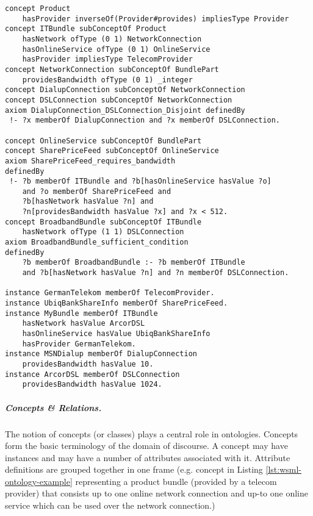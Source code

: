 \begin{lstlisting}[label=lst:wsml-ontology-example,style=wsml, caption=WSML Example Ontology]
concept Product
    hasProvider inverseOf(Provider#provides) impliesType Provider
concept ITBundle subConceptOf Product
    hasNetwork ofType (0 1) NetworkConnection
    hasOnlineService ofType (0 1) OnlineService
    hasProvider impliesType TelecomProvider
concept NetworkConnection subConceptOf BundlePart
    providesBandwidth ofType (0 1) _integer
concept DialupConnection subConceptOf NetworkConnection
concept DSLConnection subConceptOf NetworkConnection
axiom DialupConnection_DSLConnection_Disjoint definedBy
 !- ?x memberOf DialupConnection and ?x memberOf DSLConnection.

concept OnlineService subConceptOf BundlePart
concept SharePriceFeed subConceptOf OnlineService
axiom SharePriceFeed_requires_bandwidth
definedBy
 !- ?b memberOf ITBundle and ?b[hasOnlineService hasValue ?o]
    and ?o memberOf SharePriceFeed and
    ?b[hasNetwork hasValue ?n] and
    ?n[providesBandwidth hasValue ?x] and ?x < 512.
concept BroadbandBundle subConceptOf ITBundle
    hasNetwork ofType (1 1) DSLConnection
axiom BroadbandBundle_sufficient_condition
definedBy
    ?b memberOf BroadbandBundle :- ?b memberOf ITBundle
    and ?b[hasNetwork hasValue ?n] and ?n memberOf DSLConnection.

instance GermanTelekom memberOf TelecomProvider.
instance UbiqBankShareInfo memberOf SharePriceFeed.
instance MyBundle memberOf ITBundle
    hasNetwork hasValue ArcorDSL
    hasOnlineService hasValue UbiqBankShareInfo
    hasProvider GermanTelekom.
instance MSNDialup memberOf DialupConnection
    providesBandwidth hasValue 10.
instance ArcorDSL memberOf DSLConnection
    providesBandwidth hasValue 1024.

\end{lstlisting}

\subparagraph{\small \it \bfseries Concepts \& Relations.} The notion of concepts
(or classes) plays a central role in ontologies. Concepts form the
basic terminology of the domain of discourse. A concept may have
instances and may have a number of attributes associated with it.
Attribute definitions are grouped together in one frame (e.g.
concept  in Listing \ref{lst:wsml-ontology-example}
representing a product bundle (provided by
a telecom provider) that consists up to one online network
connection and up-to one online service which can be used over the
network connection.)

